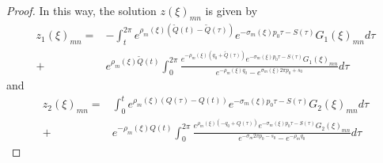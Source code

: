 \documentclass[sn-mathphys-num]{sn-jnl}%
\numberwithin{equation}{section}
\theoremstyle{thmstyleone}
\theoremstyle{thmstyletwo}
\theoremstyle{thmstylethree}
\begin{document}
\begin{proof}
 In this way, the solution $z(\xi)_{mn}$ is given by
 \begin{align}\label{solz_1} z_1(\xi)_{mn} = & -\int_t^{2\pi}e^{\rho_m(\xi)(\widetilde{Q}(t)-\widetilde{Q}(\tau))}e^{-\sigma_m(\xi)p_0 \tau -S(\tau)}G_1(\xi)_{mn}d\tau \nonumber \\
 	+ & e^{\rho_m(\xi)\widetilde{Q}(t)} \int_0^{2\pi} \frac{ e^{-\rho_m(\xi)(q_0+\widetilde{Q}(\tau))}e^{-\sigma_m(\xi)p_0 \tau-S(\tau)}G_1(\xi)_{mn}}{ e^{-\rho_m(\xi)q_0}-e^{\sigma_m(\xi)2\pi p_0 +s_0}}d\tau
 \end{align}
 and
 \begin{align}\label{solz_2}
 	z_2(\xi)_{mn} =& \int_0^t e^{\rho_m(\xi)(Q(\tau)-Q(t))}e^{-\sigma_m(\xi)p_0 \tau -S(\tau)}G_2(\xi)_{mn}d\tau \nonumber \\
 	+ & e^{-\rho_m(\xi)Q(t)} \int_0^{2\pi} \frac{e^{\rho_m(\xi)(-q_0+Q(\tau))}e^{-\sigma_m(\xi)p_0 \tau -S(\tau)}G_2(\xi)_{mn}}{e^{-\sigma_m 2\pi p_0-s_0}-e^{-\rho_m q_0}}d\tau
 \end{align}
 

\end{proof}
\end{document}
